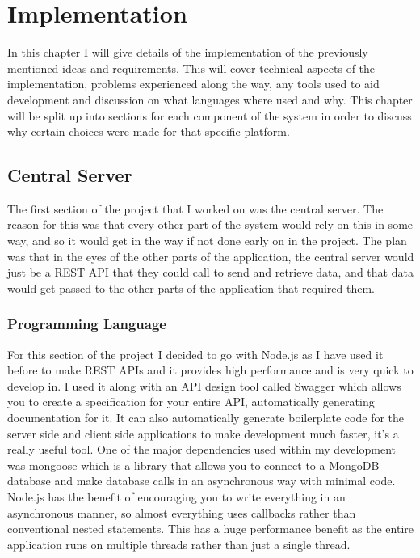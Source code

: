 \chapter{Implementation}
\label{chap:implementation}
In this chapter I will give details of the implementation of the previously mentioned ideas and requirements. This will cover technical aspects of the implementation, problems experienced along the way, any tools used to aid development and discussion on what languages where used and why. This chapter will be split up into sections for each component of the system in order to discuss why certain choices were made for that specific platform.

\section{Central Server}
The first section of the project that I worked on was the central server. The reason for this was that every other part of the system would rely on this in some way, and so it would get in the way if not done early on in the project. The plan was that in the eyes of the other parts of the application, the central server would just be a REST API that they could call to send and retrieve data, and that data would get passed to the other parts of the application that required them.

\subsection{Programming Language}
For this section of the project I decided to go with Node.js as I have used it before to make REST APIs and it provides high performance and is very quick to develop in. I used it along with an API design tool called Swagger which allows you to create a specification for your entire API, automatically generating documentation for it. It can also automatically generate boilerplate code for the server side and client side applications to make development much faster, it's a really useful tool. One of the major dependencies used within my development was mongoose which is a library that allows you to connect to a MongoDB database and make database calls in an asynchronous way with minimal code. Node.js has the benefit of encouraging you to write everything in an asynchronous manner, so almost everything uses callbacks rather than conventional nested statements. This has a huge performance benefit as the entire application runs on multiple threads rather than just a single thread.

